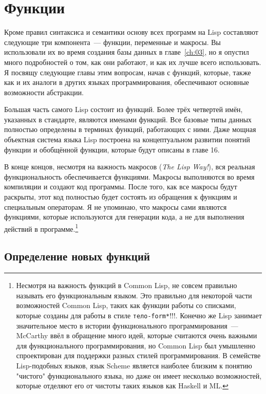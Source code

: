\chapter{Функции}
\label{ch:05}

Кроме правил синтаксиса и семантики основу всех программ на Lisp составляют следующие три
компонента~--- функции, переменные и макросы.  Вы использовали их во время создания базы
данных в главе~\ref{ch:03}, но я опустил много подробностей о том, как они работают, и как
их лучше всего использовать.  Я посвящу следующие главы этим вопросам, начав с функций,
которые, также как и их аналоги в других языках программирования, обеспечивают основные
возможности абстракции.

Большая часть самого Lisp состоит из функций.  Более трёх четвертей имён, указанных в
стандарте, являются именами функций.  Все базовые типы данных полностью определены в
терминах функций, работающих с ними. Даже мощная объектная система языка Lisp построена на
концептуальном развитии понятий функции и обобщённой функции, которые будут описаны в
главе 16.

В конце концов, несмотря на важность макросов (\textit{The Lisp Way!}), вся реальная
функциональность обеспечивается функциями.  Макросы выполняются во время компиляции и
создают код программы. После того, как все макросы будут раскрыты, этот код полностью
будет состоять из обращения к функциям и специальным операторам.  Я не упоминаю, что
макросы сами являются функциями, которые используются для генерации кода, а не для
выполнения действий в программе.\footnote{Несмотря на важность функций в Common Lisp, не
  совсем правильно называть его функциональным языком.  Это правильно для некоторой части
  возможностей Common Lisp, таких как функции работы со списками, которые созданы для
  работы в стиле \lstinline{тело-form*}!!!. Конечно же Lisp занимает значительное место в
  истории функционального программирования~--- McCarthy ввёл в обращение много идей,
  которые считаются очень важными для функционального программирования, но Common Lisp был
  умышленно спроектирован для поддержки разных стилей программирования.  В семействе
  Lisp-подобных языков, язык Scheme является наиболее близким к понятию "чистого"
  функционального языка, но даже он имеет несколько возможностей, которые отделяют его от
  чистоты таких языков как Haskell и ML.}

\section{Определение новых функций}

